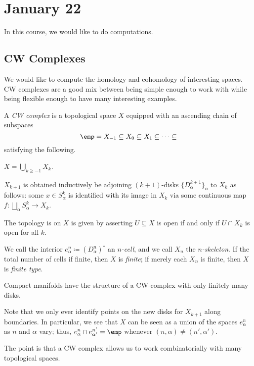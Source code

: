 \documentclass[../notes.tex]{subfiles}
\begin{document}
\section{January 22}

In this course, we would like to do computations.

\subsection{CW Complexes}
We would like to compute the homology and cohomology of interesting spaces. CW complexes are a good mix between being simple enough to work with while being flexible enough to have many interesting examples.
\begin{definition}[CW complex]
	A \textit{CW complex} is a topological space $X$ equipped with an ascending chain of subspaces
	\[\emp=X_{-1}\subseteq X_0\subseteq X_1\subseteq\cdots\subseteq\]
	satisfying the following.
	\begin{listroman}
		\item $X=\bigcup_{k\ge-1}X_k$.
		\item $X_{k+1}$ is obtained inductively be adjoining $(k+1)$-disks $\{D_\alpha^{k+1}\}_\alpha$ to $X_k$ as follows: some $x\in S^k_\alpha$ is identified with its image in $X_k$ via some continuous map $f\colon\bigsqcup_\alpha S_\alpha^k\to X_k$.
		\item The topology is on $X$ is given by asserting $U\subseteq X$ is open if and only if $U\cap X_k$ is open for all $k$.
	\end{listroman}
	We call the interior $e^n_\alpha\coloneqq(D_\alpha^n)^\circ$ an \textit{$n$-cell}, and we call $X_n$ the \textit{$n$-skeleton}. If the total number of cells if finite, then $X$ is \textit{finite}; if merely each $X_n$ is finite, then $X$ is \textit{finite type}.
\end{definition}
\begin{example}
	Compact manifolds have the structure of a CW-complex with only finitely many disks.
\end{example}
\begin{remark}
	Note that we only ever identify points on the new disks for $X_{k+1}$ along boundaries. In particular, we see that $X$ can be seen as a union of the spaces $e^n_\alpha$ as $n$ and $\alpha$ vary; thus, $e_\alpha^n\cap e_{\alpha'}^{n'}=\emp$ whenever $(n,\alpha)\ne(n',\alpha')$.
\end{remark}
The point is that a CW complex allows us to work combinatorially with many topological spaces.
\end{document}
